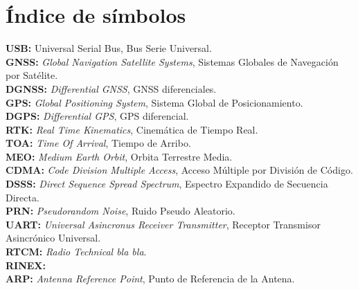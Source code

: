 \documentclass[a4paper,12pt,oneside,onecolumn,final,openright]{book}%
\begin{document}
\chapter*{Índice de símbolos}
\noindent\textbf{USB:} Universal Serial Bus, Bus Serie Universal.\\
\textbf{GNSS:} \textit{Global Navigation Satellite Systems}, Sistemas Globales de Navegación por Satélite.\\
\textbf{DGNSS:} \textit{Differential GNSS}, GNSS diferenciales.\\
\textbf{GPS:} \textit{Global Positioning System}, Sistema Global de Posicionamiento.\\
\textbf{DGPS:} \textit{Differential GPS}, GPS diferencial.\\
\textbf{RTK:} \textit{Real Time Kinematics}, Cinemática de Tiempo Real.\\
\textbf{TOA:} \textit{Time Of Arrival}, Tiempo de Arribo.\\
\textbf{MEO:} \textit{Medium Earth Orbit}, Orbita Terrestre Media.\\
\textbf{CDMA:} \textit{Code Division Multiple Access}, Acceso Múltiple por División de Código.\\
\textbf{DSSS:} \textit{Direct Sequence Spread Spectrum}, Espectro Expandido de Secuencia Directa.\\
\textbf{PRN:} \textit{Pseudorandom Noise}, Ruido Pseudo Aleatorio.\\
\textbf{UART:} \textit{Universal Asincronus Receiver Transmitter}, Receptor Transmisor Asincrónico Universal.\\
\textbf{RTCM:} \textit{Radio Technical bla bla}.\\
\textbf{RINEX:}\\
\textbf{ARP:} \textit{Antenna Reference Point}, Punto de Referencia de la Antena.\\
\newpage

\listoffigures


\end{document}
